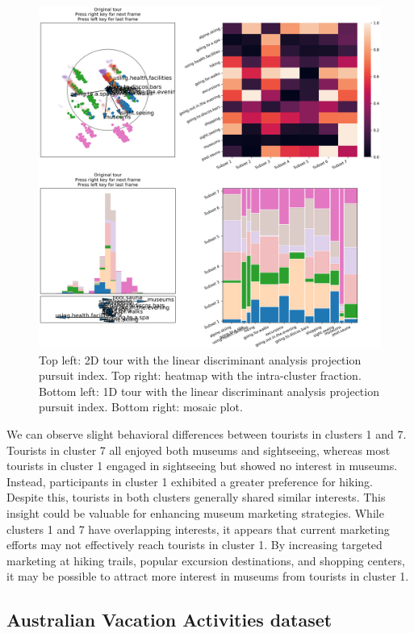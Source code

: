 \documentclass[article]{ajs}
\begin{document}
\begin{figure}[h!]
    \centering
    \includegraphics[width=1\textwidth]{winter_cl7_post.png}
    \caption{Top left: 2D tour with the linear discriminant analysis projection pursuit index. Top right: heatmap with the intra-cluster fraction. Bottom left: 1D tour with the linear discriminant analysis projection pursuit index. Bottom right: mosaic plot.}
    \label{fig:winter_cl7_post}
\end{figure}


We can observe slight behavioral differences between tourists in clusters 1 and 7. Tourists in cluster 7 all enjoyed both museums and sightseeing, whereas most tourists in cluster 1 engaged in sightseeing but showed no interest in museums. Instead, participants in cluster 1 exhibited a greater preference for hiking. Despite this, tourists in both clusters generally shared similar interests. This insight could be valuable for enhancing museum marketing strategies. While clusters 1 and 7 have overlapping interests, it appears that current marketing efforts may not effectively reach tourists in cluster 1. By increasing targeted marketing at hiking trails, popular excursion destinations, and shopping centers, it may be possible to attract more interest in museums from tourists in cluster 1.

\subsection{Australian Vacation Activities dataset}
\end{document}

